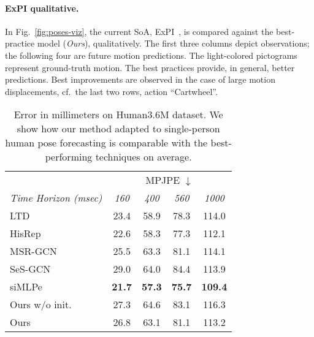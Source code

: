 \documentclass[10pt,twocolumn,letterpaper]{article}
\begin{document}
\vspace{-.3cm}
\paragraph{ExPI qualitative.}
In Fig.~\ref{fig:poses-viz}, the current SoA, ExPI~\cite{guo21}, is compared against the best-practice model (\emph{Ours}), qualitatively. The first three columns depict observations; the following four are future motion predictions.
The light-colored pictograms represent ground-truth motion.
The best practices provide, in general, better predictions. Best improvements are observed in the case of large motion displacements, cf.\ the last two rows, action ``Cartwheel''.

\begin{table}[!h]
\centering

\begin{tabular}{lcccc}
\hline
                                          & \multicolumn{4}{c}{MPJPE $\downarrow$}                                                       \\ \cline{2-5}
\multicolumn{1}{l}{\textit{Time Horizon (msec)}} & {\textit{160}} & {\textit{400}} & {\textit{560}} & {\textit{1000}} \\ \hline \hline
\multicolumn{1}{l|}{LTD~\cite{mao19ltd}}                 & 23.4               & 58.9               & 78.3               & 114.0               \\
\multicolumn{1}{l|}{HisRep~\cite{mao20his}}              & 22.6                 & 58.3               & 77.3               & 112.1               \\
\multicolumn{1}{l|}{MSR-GCN~\cite{Dang21}}             & 25.5               & 63.3               & 81.1               & 114.1               \\
\multicolumn{1}{l|}{SeS-GCN ~\cite{sampieri22}}             & 29.0           & 64.0               & 84.4               & 113.9               \\
\multicolumn{1}{l|}{siMLPe~\cite{guo2022back}}             & \textbf{21.7}               & \textbf{57.3}               & \textbf{75.7}               & \textbf{109.4}               \\ \hline
\multicolumn{1}{l|}{Ours w/o init.}  & 27.3              & 64.6               & 83.1               & 116.3               \\ 
\multicolumn{1}{l|}{Ours}  & 26.8               & 63.1               & 81.1               & 113.2               \\ \hline
\end{tabular}
\caption{Error in millimeters on Human3.6M dataset. We show how our method adapted to single-person human pose forecasting is comparable with the best-performing techniques on average.}
\label{tab:h36m}
\end{table}
\end{document}
